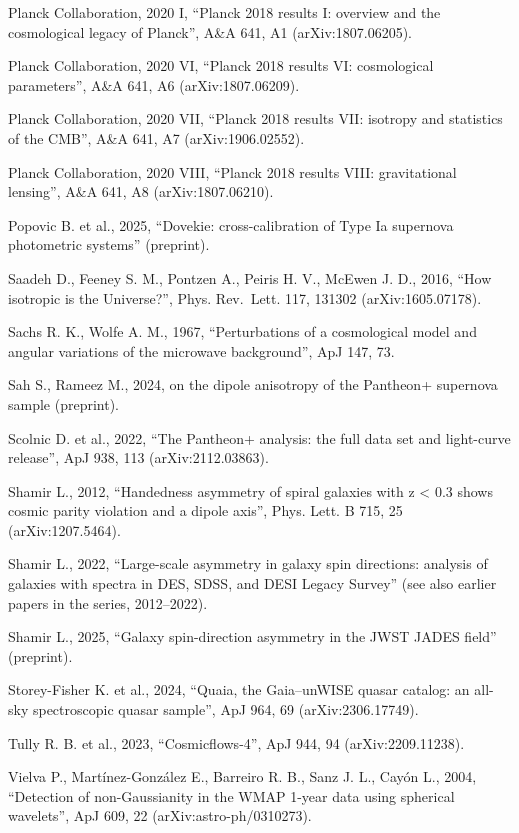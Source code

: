 \documentclass[
]{article}
\begin{document}
Planck Collaboration, 2020 I, ``Planck 2018 results I: overview and the
cosmological legacy of Planck'', A\&A 641, A1 (arXiv:1807.06205).

Planck Collaboration, 2020 VI, ``Planck 2018 results VI: cosmological
parameters'', A\&A 641, A6 (arXiv:1807.06209).

Planck Collaboration, 2020 VII, ``Planck 2018 results VII: isotropy and
statistics of the CMB'', A\&A 641, A7 (arXiv:1906.02552).

Planck Collaboration, 2020 VIII, ``Planck 2018 results VIII:
gravitational lensing'', A\&A 641, A8 (arXiv:1807.06210).

Popovic B. et al., 2025, ``Dovekie: cross-calibration of Type Ia
supernova photometric systems'' (preprint).

Saadeh D., Feeney S. M., Pontzen A., Peiris H. V., McEwen J. D., 2016,
``How isotropic is the Universe?'', Phys. Rev.~Lett. 117, 131302
(arXiv:1605.07178).

Sachs R. K., Wolfe A. M., 1967, ``Perturbations of a cosmological model
and angular variations of the microwave background'', ApJ 147, 73.

Sah S., Rameez M., 2024, on the dipole anisotropy of the Pantheon+
supernova sample (preprint).

Scolnic D. et al., 2022, ``The Pantheon+ analysis: the full data set and
light-curve release'', ApJ 938, 113 (arXiv:2112.03863).

Shamir L., 2012, ``Handedness asymmetry of spiral galaxies with z
\textless{} 0.3 shows cosmic parity violation and a dipole axis'', Phys.
Lett. B 715, 25 (arXiv:1207.5464).

Shamir L., 2022, ``Large-scale asymmetry in galaxy spin directions:
analysis of galaxies with spectra in DES, SDSS, and DESI Legacy Survey''
(see also earlier papers in the series, 2012--2022).

Shamir L., 2025, ``Galaxy spin-direction asymmetry in the JWST JADES
field'' (preprint).

Storey-Fisher K. et al., 2024, ``Quaia, the Gaia--unWISE quasar catalog:
an all-sky spectroscopic quasar sample'', ApJ 964, 69
(arXiv:2306.17749).

Tully R. B. et al., 2023, ``Cosmicflows-4'', ApJ 944, 94
(arXiv:2209.11238).

Vielva P., Martínez-González E., Barreiro R. B., Sanz J. L., Cayón L.,
2004, ``Detection of non-Gaussianity in the WMAP 1-year data using
spherical wavelets'', ApJ 609, 22 (arXiv:astro-ph/0310273).
\end{document}
